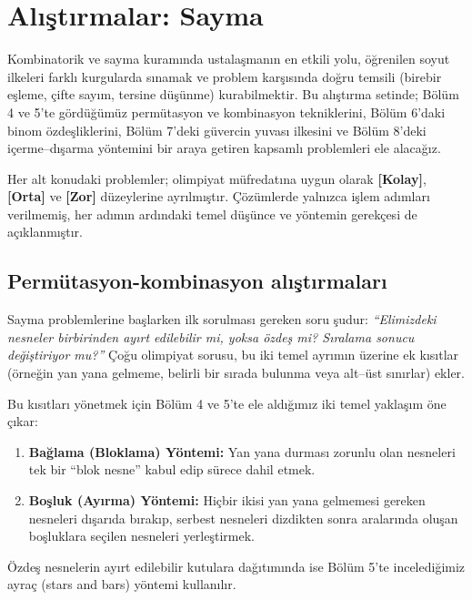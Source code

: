 \chapter{Alıştırmalar: Sayma}

Kombinatorik ve sayma kuramında ustalaşmanın en etkili yolu, öğrenilen soyut ilkeleri farklı kurgularda sınamak ve problem karşısında doğru temsili (birebir eşleme, çifte sayım, tersine düşünme) kurabilmektir. Bu alıştırma setinde; Bölüm 4 ve 5'te gördüğümüz permütasyon ve kombinasyon tekniklerini, Bölüm 6'daki binom özdeşliklerini, Bölüm 7'deki güvercin yuvası ilkesini ve Bölüm 8'deki içerme--dışarma yöntemini bir araya getiren kapsamlı problemleri ele alacağız.

Her alt konudaki problemler; olimpiyat müfredatına uygun olarak \textbf{[Kolay]}, \textbf{[Orta]} ve \textbf{[Zor]} düzeylerine ayrılmıştır. Çözümlerde yalnızca işlem adımları verilmemiş, her adımın ardındaki temel düşünce ve yöntemin gerekçesi de açıklanmıştır.

\section{Permütasyon-kombinasyon alıştırmaları}

Sayma problemlerine başlarken ilk sorulması gereken soru şudur: \emph{``Elimizdeki nesneler birbirinden ayırt edilebilir mi, yoksa özdeş mi? Sıralama sonucu değiştiriyor mu?''} Çoğu olimpiyat sorusu, bu iki temel ayrımın üzerine ek kısıtlar (örneğin yan yana gelmeme, belirli bir sırada bulunma veya alt--üst sınırlar) ekler.

Bu kısıtları yönetmek için Bölüm 4 ve 5'te ele aldığımız iki temel yaklaşım öne çıkar:
\begin{enumerate}
    \item \textbf{Bağlama (Bloklama) Yöntemi:} Yan yana durması zorunlu olan nesneleri tek bir ``blok nesne'' kabul edip sürece dahil etmek.
    \item \textbf{Boşluk (Ayırma) Yöntemi:} Hiçbir ikisi yan yana gelmemesi gereken nesneleri dışarıda bırakıp, serbest nesneleri dizdikten sonra aralarında oluşan boşluklara seçilen nesneleri yerleştirmek.
\end{enumerate}

Özdeş nesnelerin ayırt edilebilir kutulara dağıtımında ise Bölüm 5'te incelediğimiz ayraç (stars and bars) yöntemi kullanılır.

